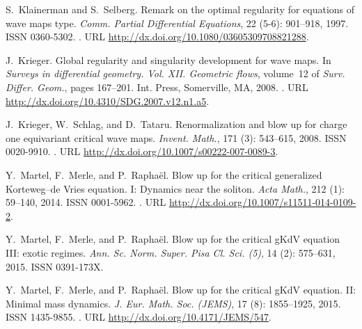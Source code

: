 \documentclass[11pt]{aims}
\theoremstyle{definition}
\numberwithin{equation}{section}
\begin{document}
\begin{thebibliography}{62}
S.~Klainerman and S.~Selberg.
\newblock Remark on the optimal regularity for equations of wave maps type.
\newblock \emph{Comm. Partial Differential Equations}, 22
  (5-6): 901--918, 1997.
\newblock ISSN 0360-5302.
\newblock {}.
\newblock URL \url{http://dx.doi.org/10.1080/03605309708821288}.

J.~Krieger.
\newblock Global regularity and singularity development for wave maps.
\newblock In \emph{Surveys in differential geometry. {V}ol. {XII}. {G}eometric
  flows}, volume~12 of \emph{Surv. Differ. Geom.}, pages 167--201. Int. Press,
  Somerville, MA, 2008.
\newblock {}.
\newblock URL \url{http://dx.doi.org/10.4310/SDG.2007.v12.n1.a5}.

J.~Krieger, W.~Schlag, and D.~Tataru.
\newblock Renormalization and blow up for charge one equivariant critical wave
  maps.
\newblock \emph{Invent. Math.}, 171 (3): 543--615, 2008.
\newblock ISSN 0020-9910.
\newblock {}.
\newblock URL \url{http://dx.doi.org/10.1007/s00222-007-0089-3}.

Y.~Martel, F.~Merle, and P.~Rapha{\"e}l.
\newblock Blow up for the critical generalized {K}orteweg--de {V}ries equation.
  {I}: {D}ynamics near the soliton.
\newblock \emph{Acta Math.}, 212 (1): 59--140, 2014.
\newblock ISSN 0001-5962.
\newblock {}.
\newblock URL \url{http://dx.doi.org/10.1007/s11511-014-0109-2}.

Y.~Martel, F.~Merle, and P.~Rapha{\"e}l.
\newblock Blow up for the critical g{K}d{V} equation {III}: exotic regimes.
\newblock \emph{Ann. Sc. Norm. Super. Pisa Cl. Sci. (5)}, 14
  (2): 575--631, 2015{}.
\newblock ISSN 0391-173X.

Y.~Martel, F.~Merle, and P.~Rapha{\"e}l.
\newblock Blow up for the critical g{K}d{V} equation. {II}: {M}inimal mass
  dynamics.
\newblock \emph{J. Eur. Math. Soc. (JEMS)}, 17 (8):
  1855--1925, 2015{}.
\newblock ISSN 1435-9855.
\newblock {}.
\newblock URL \url{http://dx.doi.org/10.4171/JEMS/547}.


\end{thebibliography}
\end{document}
